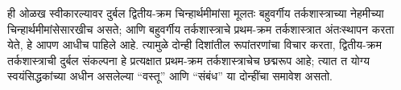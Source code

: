 \documentclass[../../../include/open-logic-section]{subfiles}
\begin{document}
ही ओळख स्वीकारल्यावर दुर्बल द्वितीय-क्रम चिन्हार्थमीमांसा मूलतः बहुवर्गीय
तर्कशास्त्राच्या नेहमीच्या चिन्हार्थमीमांसेसारखीच असते; आणि बहुवर्गीय
तर्कशास्त्राचे प्रथम-क्रम तर्कशास्त्रात अंतःस्थापन करता येते, हे आपण आधीच
पाहिले आहे. त्यामुळे दोन्ही दिशांतील रूपांतरणांचा विचार करता, द्वितीय-क्रम
तर्कशास्त्राची दुर्बल संकल्पना हे प्रत्यक्षात प्रथम-क्रम तर्कशास्त्राचेच
छद्मरूप आहे; त्यात त योग्य स्वयंसिद्धकांच्या अधीन असलेल्या
“वस्तू” आणि “संबंध” या दोन्हींचा समावेश असतो.
\end{document}

